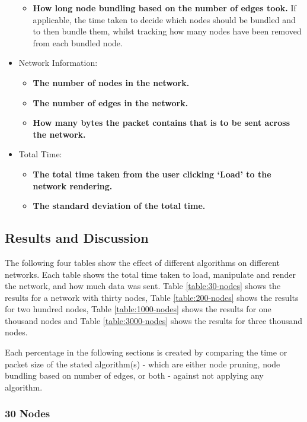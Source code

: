 \documentclass[../dissertation.tex]{subfiles}
\begin{document}
\begin{itemize}
\begin{itemize}
        \item \textbf{How long node bundling based on the number of edges took.}  If applicable, the time taken to decide which nodes should be bundled and to then bundle them, whilst tracking how many nodes have been removed from each bundled node.
    \end{itemize}
    \item Network Information:
    \begin{itemize}
        \item \textbf{The number of nodes in the network.}
        \item \textbf{The number of edges in the network.}
        \item \textbf{How many bytes the packet contains that is to be sent across the network.}
    \end{itemize}
    \item Total Time:
    \begin{itemize}
        \item \textbf{The total time taken from the user clicking `Load' to the network rendering.}
        \item \textbf{The standard deviation of the total time.}
    \end{itemize}
\end{itemize}

\subsection{Results and Discussion}

The following four tables show the effect of different algorithms on different networks. Each table shows the total time taken to load, manipulate and render the network, and how much data was sent. Table \ref{table:30-nodes} shows the results for a network with thirty nodes, Table \ref{table:200-nodes} shows the results for two hundred nodes, Table \ref{table:1000-nodes} shows the results for one thousand nodes and Table \ref{table:3000-nodes} shows the results for three thousand nodes. 

Each percentage in the following sections is created by comparing the time or packet size of the stated algorithm(s) - which are either node pruning, node bundling based on number of edges, or both - against not applying any algorithm.

\subsubsection{30 Nodes}
\end{document}
